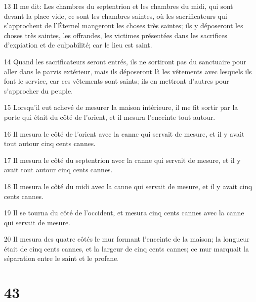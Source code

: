 \par 13 Il me dit: Les chambres du septentrion et les chambres du midi, qui sont devant la place vide, ce sont les chambres saintes, où les sacrificateurs qui s'approchent de l'Éternel mangeront les choses très saintes; ils y déposeront les choses très saintes, les offrandes, les victimes présentées dans les sacrifices d'expiation et de culpabilité; car le lieu est saint.
\par 14 Quand les sacrificateurs seront entrés, ils ne sortiront pas du sanctuaire pour aller dans le parvis extérieur, mais ils déposeront là les vêtements avec lesquels ils font le service, car ces vêtements sont saints; ils en mettront d'autres pour s'approcher du peuple.
\par 15 Lorsqu'il eut achevé de mesurer la maison intérieure, il me fit sortir par la porte qui était du côté de l'orient, et il mesura l'enceinte tout autour.
\par 16 Il mesura le côté de l'orient avec la canne qui servait de mesure, et il y avait tout autour cinq cents cannes.
\par 17 Il mesura le côté du septentrion avec la canne qui servait de mesure, et il y avait tout autour cinq cents cannes.
\par 18 Il mesura le côté du midi avec la canne qui servait de mesure, et il y avait cinq cents cannes.
\par 19 Il se tourna du côté de l'occident, et mesura cinq cents cannes avec la canne qui servait de mesure.
\par 20 Il mesura des quatre côtés le mur formant l'enceinte de la maison; la longueur était de cinq cents cannes, et la largeur de cinq cents cannes; ce mur marquait la séparation entre le saint et le profane.

\chapter{43}

